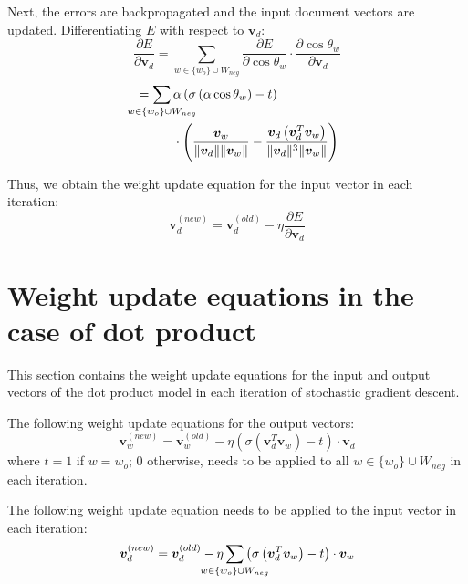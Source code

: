\documentclass[11pt,a4paper]{article}
\begin{document}
Next, the errors are backpropagated and the input document vectors are updated. Differentiating $E$ with respect to $\mathbold{v}_d$: 
\begin{equation}
\frac {\partial E} {\partial \mathbold{v}_d} = \sum_{w \in \{w_o\} \cup W_{neg}}  \frac {\partial E} {\partial \cos \theta_w} \cdot \frac {\partial \cos \theta_w} {\partial \mathbold{v}_d}
\end{equation}
\begin{align}
{}= \sum_{\mathclap{w \in \{w_o\} \cup W_{neg}}}{} &\alpha \left( \sigma \left( \alpha \cos \theta_w \right) - t \right) \nonumber \\
&\cdot\left( \frac {\mathbold{v}_w} {\lVert \mathbold{v}_d \rVert \lVert \mathbold{v}_w \rVert} - \frac { \mathbold{v}_d\left(\mathbold{v}_d^T \mathbold{v}_w\right)} {\lVert \mathbold{v}_d \rVert^3 \lVert \mathbold{v}_w \rVert} \right)
\end{align}

Thus, we obtain the weight update equation for the input vector in each iteration: 
\begin{equation}
\mathbold{v}_d^{(new)} = \mathbold{v}_d^{(old)} - \eta \frac {\partial E} {\partial \mathbold{v}_d}
\end{equation}

\section{Weight update equations in the case of dot product}
This section contains the weight update equations for the input and output vectors of the dot product model in each iteration of stochastic gradient descent.

The following weight update equations for the output vectors:
\begin{equation}
\mathbold{v}_w^{(new)} = \mathbold{v}_w^{(old)} - \eta \left( \sigma \left( \mathbold{v}_d^T \mathbold{v}_w \right) - t \right) \cdot \mathbold{v}_d
\end{equation}
where $t = 1$ if $w = w_o$; $0$ otherwise, needs to be applied to all $w \in \{w_o\} \cup W_{neg}$ in each iteration.

The following weight update equation needs to be applied to the input vector in each iteration:
\begin{equation}
\mathbold{v}_d^{(new)} = \mathbold{v}_d^{(old)} - \eta \sum_{\mathclap{w \in \{w_o\} \cup W_{neg}}} \left( \sigma \left( \mathbold{v}_d^T \mathbold{v}_w \right) - t \right) \cdot \mathbold{v}_w
\end{equation}
\end{document}
